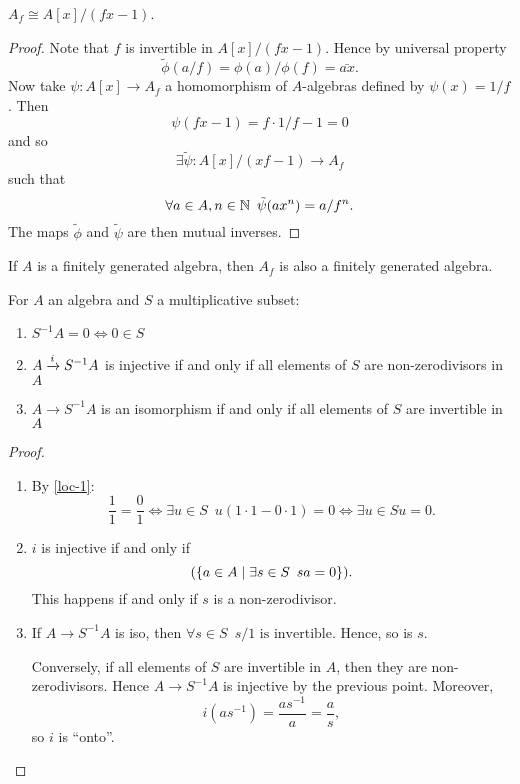 \begin{lemma}
  \label{loc-1}
  $A_f \cong A[x] / {(fx-1)}$.
\end{lemma}

\begin{proof}
  Note that $f$ is invertible in $A[x] / {(fx-1)}$.
  Hence by universal property
  \[\tilde{\phi}(a / f) = \phi(a) / \phi(f) = \bar{ax}. \]
  Now take
  $\psi \colon A[x] \to A_f$ a homomorphism of $A$-algebras defined by $\psi(x) = 1 / f$.
  Then
  \[ \psi(fx - 1) = f \cdot 1 / f - 1 = 0 \]
  and so
  \[ \exists \tilde \psi \colon A[x] /{(xf-1)} \to A_f \]
  such that
  \[ \forall a \in A, n \in \mathbb N \enspace \tilde \psi (a x^n) = a / f^n.\]
  The maps $\tilde \phi$ and $\tilde \psi$ are then mutual inverses.
\end{proof}

\begin{corollary}
  If $A$ is a finitely generated algebra, then $A_f$ is also a finitely generated algebra.
\end{corollary}

\begin{lemma}
  For $A$ an algebra and $S$ a multiplicative subset:
  \begin{enumerate}
  \item $S^{-1}A = 0 \iff 0 \in S$
  \item $A \xrightarrow{i} S^{-1}A$ is injective if and only if all elements of $S$ are non-zerodivisors in $A$
  \item $A \to S^{-1}A$ is an isomorphism if and only if all elements of $S$ are invertible in $A$
  \end{enumerate}
\end{lemma}
\begin{proof}
  \begin{enumerate}
  \item By \cref{loc-1}:
    \[ \frac{1}{1} = \frac{0}{1} \iff \exists u \in S \enspace u(1 \cdot 1 - 0 \cdot 1 ) = 0 \iff \exists u \in S u = 0.\]
  \item $i$ is injective if and only if
    \[ (\{a \in A \mathrel{|} \exists s \in S \enspace sa = 0 \}).\]
    This happens if and only if $s$ is a non-zerodivisor.
  \item If $A \to S^{-1}A$ is iso, then $\forall s \in S \enspace s/1 \text{ is invertible}$.
    Hence, so is $s$.

    Conversely, if all elements of $S$ are invertible in $A$, then they are non-zerodivisors. Hence $A \to S^{-1}A$ is injective by the previous point.
    Moreover,
    \[i (a s^{-1}) = \frac{a s^{-1}}{a} = \frac{a}{s},\]
    so $i$ is ``onto''.
  \end{enumerate}
\end{proof}

